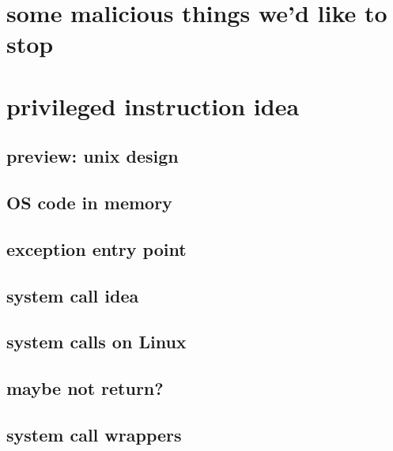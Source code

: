 \section{some malicious things we'd like to stop}



\section{privileged instruction idea}


\subsection{preview: unix design}


\subsection{OS code in memory}


\subsection{exception entry point}


\subsection{system call idea}




\subsection{system calls on Linux}


\subsection{maybe not return?}


\subsection{system call wrappers}

% 


